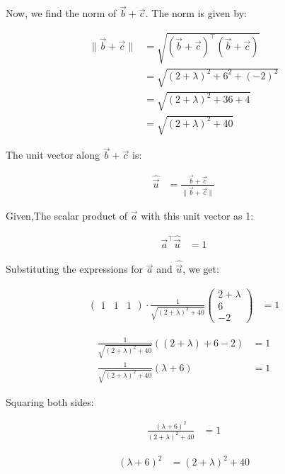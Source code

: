 \documentclass[journal]{IEEEtran}
\numberwithin{figure}{enumi}
\begin{document}
Now, we find the norm of $\vec{b} + \vec{c}$. The norm is given by:

\begin{align}
\|\vec{b} + \vec{c}\| &= \sqrt{(\vec{b} + \vec{c})^\top (\vec{b} + \vec{c})} \\
&= \sqrt{(2 + \lambda)^2 + 6^2 + (-2)^2} \\
&= \sqrt{(2 + \lambda)^2 + 36 + 4} \\
&= \sqrt{(2 + \lambda)^2 + 40}
\end{align}

The unit vector along $\vec{b} + \vec{c}$ is:

\begin{align}
\hat{\vec{u}} &= \frac{\vec{b} + \vec{c}}{\|\vec{b} + \vec{c}\|}
\end{align}

Given,The scalar product of $\vec{a}$ with this unit vector as 1:

\begin{align}
\vec{a}^\top \hat{\vec{u}} &= 1
\end{align}

Substituting the expressions for $\vec{a}$ and $\hat{\vec{u}}$, we get:

\begin{align}
\begin{pmatrix} 1 & 1 & 1 \end{pmatrix} \cdot \frac{1}{\sqrt{(2 + \lambda)^2 + 40}} \begin{pmatrix} 2 + \lambda \\ 6 \\ -2 \end{pmatrix} &= 1
\end{align}



\begin{align}
\frac{1}{\sqrt{(2 + \lambda)^2 + 40}} \left( (2 + \lambda) + 6 - 2 \right) &= 1 \\
\frac{1}{\sqrt{(2 + \lambda)^2 + 40}} ( \lambda + 6) &= 1
\end{align}

Squaring both sides:

\begin{align}
\frac{(\lambda + 6)^2}{(2 + \lambda)^2 + 40} &= 1
\end{align}



\begin{align}
(\lambda + 6)^2 &= (2 + \lambda)^2 + 40
\end{align}
\end{document}
